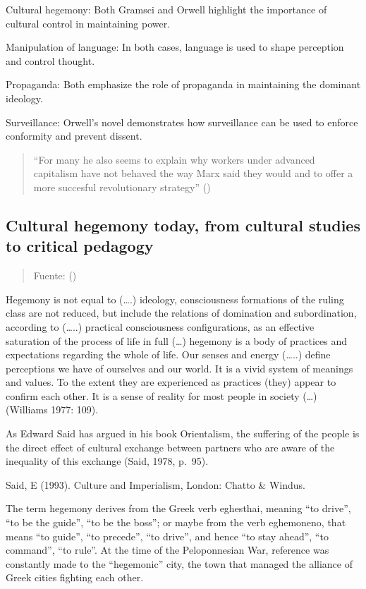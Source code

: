 \documentclass[
  letterpaper,
  DIV=11,
  numbers=noendperiod]{scrreprt}
\begin{document}
Cultural hegemony: Both Gramsci and Orwell highlight the importance of
cultural control in maintaining power.

Manipulation of language: In both cases, language is used to shape
perception and control thought.

Propaganda: Both emphasize the role of propaganda in maintaining the
dominant ideology.

Surveillance: Orwell's novel demonstrates how surveillance can be used
to enforce conformity and prevent dissent.

\begin{quote}
``For many he also seems to explain why workers under advanced
capitalism have not behaved the way Marx said they would and to offer a
more succesful revolutionary strategy'' ()
\end{quote}

\subsection{Cultural hegemony today, from cultural studies to critical
pedagogy}\label{cultural-hegemony-today-from-cultural-studies-to-critical-pedagogy}

\begin{quote}
Fuente: ()
\end{quote}

Hegemony is not equal to (\ldots.) ideology, consciousness formations of
the ruling class are not reduced, but include the relations of
domination and subordination, according to (\ldots..) practical
consciousness configurations, as an effective saturation of the process
of life in full (\ldots) hegemony is a body of practices and
expectations regarding the whole of life. Our senses and energy
(\ldots..) define perceptions we have of ourselves and our world. It is
a vivid system of meanings and values. To the extent they are
experienced as practices (they) appear to confirm each other. It is a
sense of reality for most people in society (\ldots) (Williams 1977:
109).

As Edward Said has argued in his book Orientalism, the suffering of the
people is the direct effect of cultural exchange between partners who
are aware of the inequality of this exchange (Said, 1978, p.~95).

Said, E (1993). Culture and Imperialism, London: Chatto \& Windus.

The term hegemony derives from the Greek verb eghesthai, meaning ``to
drive'', ``to be the guide'', ``to be the boss''; or maybe from the verb
eghemoneno, that means ``to guide'', ``to precede'', ``to drive'', and
hence ``to stay ahead'', ``to command'', ``to rule''. At the time of the
Peloponnesian War, reference was constantly made to the ``hegemonic''
city, the town that managed the alliance of Greek cities fighting each
other.
\end{document}
